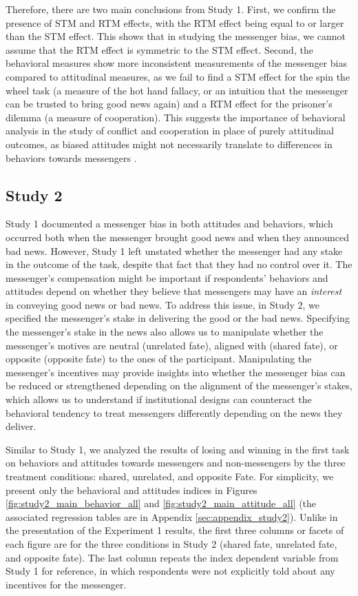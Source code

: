 Therefore, there are two main conclusions from Study 1. First, we confirm
the presence of STM and RTM effects, with the RTM effect being equal to
or larger than the STM effect. This shows that in studying the messenger
bias, we cannot assume that the RTM effect is symmetric to the STM
effect. Second, the behavioral measures show more inconsistent
measurements of the messenger bias compared to attitudinal measures, as
we fail to find a STM effect for the spin the wheel task (a measure of the hot hand fallacy, or an intuition that the messenger can be trusted to bring good news again) and a
RTM effect for the prisoner's dilemma (a measure of cooperation). This suggests the
importance of behavioral analysis in the study of conflict and
cooperation in place of purely attitudinal outcomes, as biased attitudes
might not necessarily translate to differences in behaviors towards
messengers \citep{del2020behavioral, ostrom1998behavioral}.

\subsection{Study 2}

Study 1 documented a messenger bias in both attitudes and behaviors,
which occurred both when the messenger brought good news and when they
announced bad news. However, Study 1 left unstated whether the messenger
had any stake in the outcome of the task, despite that fact that they
had no control over it. The messenger's compensation might be important
if respondents' behaviors and attitudes depend on whether they believe that
messengers may have an \emph{interest} in conveying good news or bad
news. To address this issue, in Study 2, we specified the messenger's
stake in delivering the good or the bad news. Specifying the messenger's
stake in the news also allows us to manipulate whether the messenger's
motives are neutral (unrelated fate), aligned with (shared fate), or
opposite (opposite fate) to the ones of the participant. Manipulating
the messenger's incentives may provide insights into whether the
messenger bias can be reduced or strengthened depending on the alignment
of the messenger's stakes, which allows us to understand if
institutional designs can counteract the behavioral tendency to treat
messengers differently depending on the news they deliver.

Similar to Study 1, we analyzed the results of losing and winning in the first task on behaviors and attitudes towards messengers and non-messengers by the three treatment conditions: shared, unrelated, and opposite Fate. For simplicity, we present only the behavioral and attitudes
indices in Figures \ref{fig:study2_main_behavior_all} and \ref{fig:study2_main_attitude_all} (the associated regression
tables are in Appendix \ref{sec:appendix_study2}). Unlike in the presentation of the Experiment
1 results, the first three columns or facets of each figure are for the
three conditions in Study 2 (shared fate, unrelated fate, and opposite
fate). The last column repeats the index dependent variable from
Study 1 for reference, in which respondents were not explicitly told about any
incentives for the messenger.

